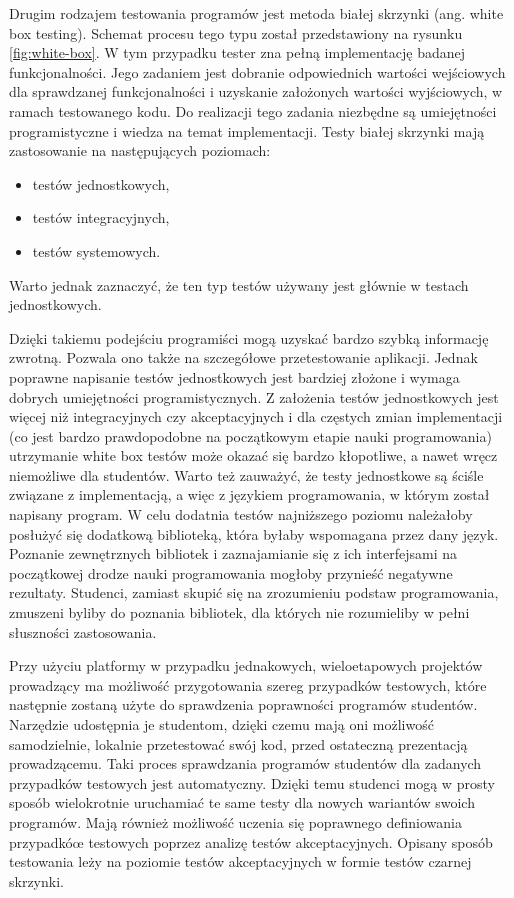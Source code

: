 Drugim rodzajem testowania programów jest metoda białej skrzynki (ang. white box testing).
Schemat procesu tego typu został przedstawiony na rysunku \ref{fig:white-box}.
W tym przypadku tester zna pełną implementację badanej funkcjonalności.
Jego zadaniem jest dobranie odpowiednich wartości wejściowych dla sprawdzanej funkcjonalności i uzyskanie założonych wartości wyjściowych, w ramach testowanego kodu.
Do realizacji tego zadania niezbędne są umiejętności programistyczne i wiedza na temat implementacji.
Testy białej skrzynki mają zastosowanie na następujących poziomach:
\begin{itemize}
    \item testów jednostkowych,
    \item testów integracyjnych,
    \item testów systemowych.
\end{itemize}
Warto jednak zaznaczyć, że ten typ testów używany jest głównie w testach jednostkowych.

Dzięki takiemu podejściu programiści mogą uzyskać bardzo szybką informację zwrotną.
Pozwala ono także na szczegółowe przetestowanie aplikacji.
Jednak poprawne napisanie testów jednostkowych jest bardziej złożone i wymaga dobrych umiejętności programistycznych.
Z założenia testów jednostkowych jest więcej niż integracyjnych czy akceptacyjnych i dla częstych zmian implementacji (co jest bardzo prawdopodobne na początkowym etapie nauki programowania) utrzymanie white box testów może okazać się bardzo kłopotliwe, a nawet wręcz niemożliwe dla studentów.
Warto też zauważyć, że testy jednostkowe są ściśle związane z implementacją, a więc z językiem programowania, w którym został napisany program.
W celu dodatnia testów najniższego poziomu należałoby posłużyć się dodatkową biblioteką, która byłaby wspomagana przez dany język.
Poznanie zewnętrznych bibliotek i zaznajamianie się z ich interfejsami na początkowej drodze nauki programowania mogłoby przynieść negatywne rezultaty.
Studenci, zamiast skupić się na zrozumieniu podstaw programowania, zmuszeni byliby do poznania bibliotek, dla których nie rozumieliby w pełni słuszności zastosowania.

Przy użyciu platformy w przypadku jednakowych, wieloetapowych projektów prowadzący ma możliwość przygotowania szereg przypadków testowych, które następnie zostaną użyte do sprawdzenia poprawności programów studentów.
Narzędzie udostępnia je studentom, dzięki czemu mają oni możliwość samodzielnie, lokalnie przetestować swój kod, przed ostateczną prezentacją prowadzącemu.
Taki proces sprawdzania programów studentów dla zadanych przypadków testowych jest automatyczny.
Dzięki temu studenci mogą w prosty sposób wielokrotnie uruchamiać te same testy dla nowych wariantów swoich programów.
Mają również możliwość uczenia się poprawnego definiowania przypadkóœ testowych poprzez analizę testów akceptacyjnych.
Opisany sposób testowania leży na poziomie testów akceptacyjnych w formie testów czarnej skrzynki.

